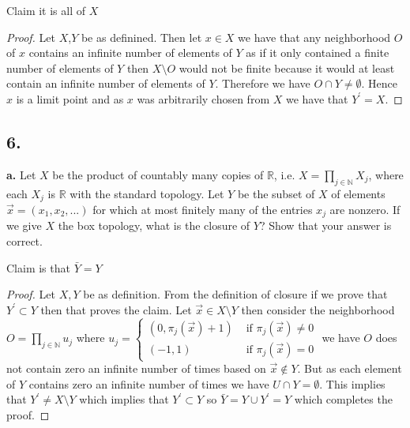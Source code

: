 \documentclass{amsart}
\theoremstyle{plain}
\theoremstyle{definition}
\theoremstyle{remark}
\begin{document}
Claim it is all of $X$ 

\begin{proof}
    Let $X$,$Y$ be as definined. Then let $x\in X$ we have that any neighborhood $O$ of $x$ contains an infinite number of elements of $Y$ as if it only contained a finite number of elements of $Y$ then $X\setminus O$ would not be finite because it would at least contain an infinite number of elements of $Y$. Therefore we have $O\cap Y\not = \emptyset$. Hence $x$ is a limit point and as $x$ was arbitrarily chosen from $X$ we have that $Y^\prime=X$.
\end{proof}

\vspace{.15in}

\noindent
\subsection*{6.} 

{\bfseries a.} Let $X$ be the product of countably many copies of $\mathbb R$, i.e. $X = \prod _{j\in \mathbb N } X_j$, where each $X_j$ is $\mathbb R$ with the standard topology. Let $Y$ be the subset of $X$ of elements $\vec{x} = ( x_1 , x_2 , . . . )$ for which at most finitely many of the entries $x_j$ are nonzero. If we give $X$ the box topology, what is the closure of $Y$? Show that your answer is correct. 

Claim is that $\bar Y=Y$

\begin{proof}
    Let $X,Y$ be as definition. From the definition of closure if we prove that $Y^\prime \subset Y$ then that proves the claim. Let  $\vec x\in X\setminus Y$ then consider the neighborhood $O=\prod_{j\in \mathbb{N}}u_j$ where $u_j=\begin{cases}
        (0,\pi_j(\vec x)+1)& \text{ if } \pi_j(\vec x)\not =0\\
        (-1,1) & \text{ if } \pi_j(\vec x) = 0
    \end{cases}$
    we have $O$ does not contain zero an infinite number of times based on $\vec x\not \in Y$. But as each element of $Y$ contains zero an infinite number of times we have $U\cap Y=\emptyset$. This implies that $Y^\prime \not = X\setminus Y$ which implies that $Y^\prime\subset Y$ so $\bar Y=Y\cup Y^\prime = Y$ which completes the proof. 



\end{proof}


\vspace{.1in}
\end{document}
